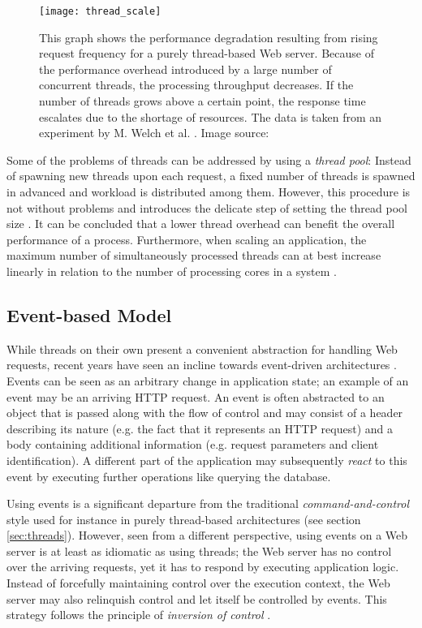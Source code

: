 \begin{figure}
\centering\small
\setlength{\tabcolsep}{0mm}
  \texttt{[image: thread\_scale]}
\caption{
This graph shows the performance degradation resulting from rising request frequency for a purely thread-based Web server. Because of the performance overhead introduced by a large number of concurrent threads, the processing throughput decreases. If the number of threads grows above a certain point, the response time escalates due to the shortage of resources. The data is taken from an experiment by M. Welch et al. \cite{Welsh2001}. Image source: \cite{Welsh2001}
}
\label{fig:thread_scale}
\end{figure}

Some of the problems of threads can be addressed by using a \textit{thread pool}: Instead of spawning new threads upon each request, a fixed number of threads is spawned in advanced and workload is distributed among them. However, this procedure is not without problems and introduces the delicate step of setting the thread pool size \cite{threadpools}. It can be concluded that a lower thread overhead can benefit the overall performance of a process. Furthermore, when scaling an application, the maximum number of simultaneously processed threads can at best increase linearly in relation to the number of processing cores in a system \cite{McCool}.

\subsection{Event-based Model}
\label{lab:events}
While threads on their own present a convenient abstraction for handling Web requests, recent years have seen an incline towards event-driven architectures \cite{Tilkov2010}. Events can be seen as an arbitrary change in application state; an example of an event may be an arriving HTTP request. An event is often abstracted to an object that is passed along with the flow of control and may consist of a header describing its nature (e.g. the fact that it represents an HTTP request) and a body containing additional information (e.g. request parameters and client identification). A different part of the application may subsequently \textit{react} to this event by executing further operations like querying the database.

Using events is a significant departure from the traditional \textit{command-and-control} style used for instance in purely thread-based architectures (see section \ref{sec:threads}). However, seen from a different perspective, using events on a Web server is at least as idiomatic as using threads; the Web server has no control over the arriving requests, yet it has to respond by executing application logic. Instead of forcefully maintaining control over the execution context, the Web server may also relinquish control and let itself be controlled by events. This strategy follows the principle of \textit{inversion of control} \cite{Hohpe2006}. 


